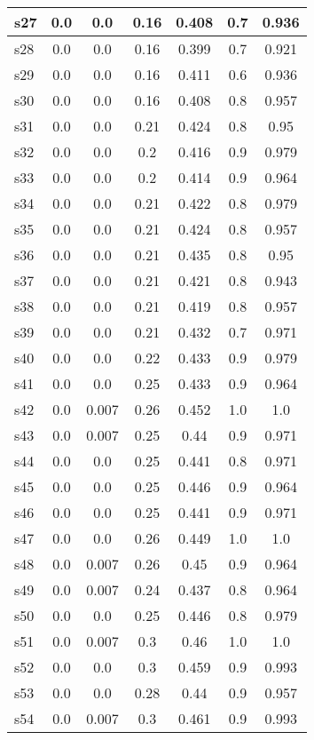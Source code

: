 \documentclass{article}
\begin{document}
\begin{tabular}{|l|c|c|c|c|c|c|}
\hline
s27 &0.0 & 0.0 & 0.16 & 0.408 & 0.7 & 0.936\\
\hline
s28 &0.0 & 0.0 & 0.16 & 0.399 & 0.7 & 0.921\\
\hline
s29 &0.0 & 0.0 & 0.16 & 0.411 & 0.6 & 0.936\\
\hline
s30 &0.0 & 0.0 & 0.16 & 0.408 & 0.8 & 0.957\\
\hline
s31 &0.0 & 0.0 & 0.21 & 0.424 & 0.8 & 0.95\\
\hline
s32 &0.0 & 0.0 & 0.2 & 0.416 & 0.9 & 0.979\\
\hline
s33 &0.0 & 0.0 & 0.2 & 0.414 & 0.9 & 0.964\\
\hline
s34 &0.0 & 0.0 & 0.21 & 0.422 & 0.8 & 0.979\\
\hline
s35 &0.0 & 0.0 & 0.21 & 0.424 & 0.8 & 0.957\\
\hline
s36 &0.0 & 0.0 & 0.21 & 0.435 & 0.8 & 0.95\\
\hline
s37 &0.0 & 0.0 & 0.21 & 0.421 & 0.8 & 0.943\\
\hline
s38 &0.0 & 0.0 & 0.21 & 0.419 & 0.8 & 0.957\\
\hline
s39 &0.0 & 0.0 & 0.21 & 0.432 & 0.7 & 0.971\\
\hline
s40 &0.0 & 0.0 & 0.22 & 0.433 & 0.9 & 0.979\\
\hline
s41 &0.0 & 0.0 & 0.25 & 0.433 & 0.9 & 0.964\\
\hline
s42 &0.0 & 0.007 & 0.26 & 0.452 & 1.0 & 1.0\\
\hline
s43 &0.0 & 0.007 & 0.25 & 0.44 & 0.9 & 0.971\\
\hline
s44 &0.0 & 0.0 & 0.25 & 0.441 & 0.8 & 0.971\\
\hline
s45 &0.0 & 0.0 & 0.25 & 0.446 & 0.9 & 0.964\\
\hline
s46 &0.0 & 0.0 & 0.25 & 0.441 & 0.9 & 0.971\\
\hline
s47 &0.0 & 0.0 & 0.26 & 0.449 & 1.0 & 1.0\\
\hline
s48 &0.0 & 0.007 & 0.26 & 0.45 & 0.9 & 0.964\\
\hline
s49 &0.0 & 0.007 & 0.24 & 0.437 & 0.8 & 0.964\\
\hline
s50 &0.0 & 0.0 & 0.25 & 0.446 & 0.8 & 0.979\\
\hline
s51 &0.0 & 0.007 & 0.3 & 0.46 & 1.0 & 1.0\\
\hline
s52 &0.0 & 0.0 & 0.3 & 0.459 & 0.9 & 0.993\\
\hline
s53 &0.0 & 0.0 & 0.28 & 0.44 & 0.9 & 0.957\\
\hline
s54 &0.0 & 0.007 & 0.3 & 0.461 & 0.9 & 0.993\\
\hline

\end{tabular}
\end{document}
